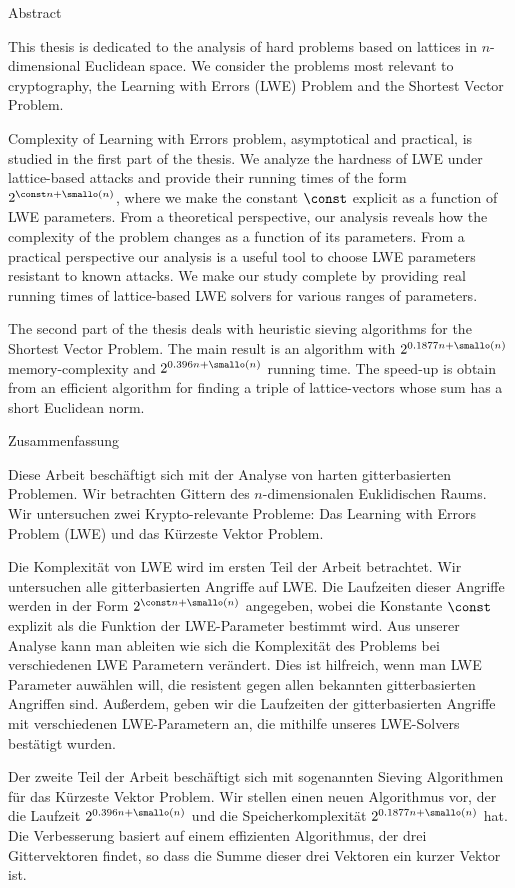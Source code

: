 Abstract

This thesis is dedicated to the analysis of hard problems based on lattices in $n$-dimensional Euclidean space. We consider the problems most relevant to cryptography, the Learning with Errors (LWE) Problem and the Shortest Vector Problem. 

Complexity of Learning with Errors problem, asymptotical and practical, is studied in the first part of the thesis. We analyze the hardness of LWE under lattice-based attacks and provide their running times of the form $2^{\const n + \smallo(n)}$, where we make the constant $\const$ explicit as a function of LWE parameters. From a theoretical perspective, our analysis reveals how the complexity of the problem changes as a function of its parameters. From a practical perspective our analysis is a useful tool to choose LWE parameters resistant to known attacks. We make our study complete by providing real running times of lattice-based LWE solvers for various ranges of parameters.

The second part of the thesis deals with heuristic sieving algorithms for the Shortest Vector Problem. The main result is an algorithm with $2^{0.1877n+\smallo(n)}$ memory-complexity and $2^{0.396n+\smallo(n)}$ running time. The speed-up is obtain from an efficient algorithm for finding a triple of lattice-vectors whose sum has a short Euclidean norm.

\hspace{2cm}

Zusammenfassung

Diese Arbeit besch{\"a}ftigt sich mit der Analyse von harten gitterbasierten Problemen. Wir betrachten Gittern des $n$-dimensionalen Euklidischen Raums. Wir untersuchen zwei Krypto-relevante Probleme: Das Learning with Errors Problem (LWE) und das K{\"u}rzeste Vektor Problem.

Die Komplexit{\"a}t von LWE wird im ersten Teil der Arbeit betrachtet. Wir untersuchen alle gitterbasierten Angriffe auf LWE. Die Laufzeiten dieser Angriffe werden in der Form $2^{\const n + \smallo(n)}$ angegeben, wobei die Konstante $\const$ explizit als die Funktion der LWE-Parameter bestimmt wird. Aus unserer Analyse kann man ableiten wie sich die Komplexit{\"a}t des Problems bei verschiedenen LWE Parametern ver{\"a}ndert. Dies ist hilfreich, wenn man LWE Parameter auw{\" a}hlen will, die resistent gegen allen bekannten gitterbasierten Angriffen sind. Au{\ss}erdem, geben wir die Laufzeiten der gitterbasierten Angriffe mit verschiedenen LWE-Parametern an, die mithilfe unseres LWE-Solvers best{\"a}tigt wurden.

Der zweite Teil der Arbeit besch{\"a}ftigt sich mit sogenannten Sieving Algorithmen f{\" u}r das K{\"u}rzeste Vektor Problem. Wir stellen einen neuen Algorithmus vor, der die Laufzeit $2^{0.396n+\smallo(n)}$ und die Speicherkomplexit{\"a}t $2^{0.1877n+\smallo(n)}$ hat. Die Verbesserung basiert auf einem effizienten Algorithmus, der drei Gittervektoren findet, so dass die Summe dieser drei Vektoren ein kurzer Vektor ist.
